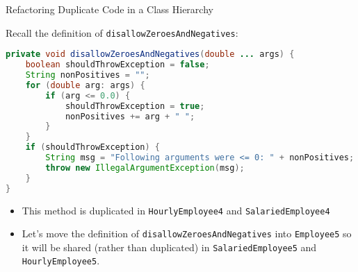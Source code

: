 \documentclass{beamer}
\begin{document}
\begin{frame}[fragile]{Refactoring Duplicate Code in a Class Hierarchy}

\vspace{-.05in}
Recall the definition of {\tt disallowZeroesAndNegatives}:
\vspace{-.05in}
\begin{lstlisting}[language=Java]
private void disallowZeroesAndNegatives(double ... args) {
    boolean shouldThrowException = false;
    String nonPositives = "";
    for (double arg: args) {
        if (arg <= 0.0) {
            shouldThrowException = true;
            nonPositives += arg + " ";
        }
    }
    if (shouldThrowException) {
        String msg = "Following arguments were <= 0: " + nonPositives;
        throw new IllegalArgumentException(msg);
    }
}
\end{lstlisting}
\vspace{-.075in}
\begin{itemize}
\item This method is duplicated in {\tt HourlyEmployee4} and {\tt SalariedEmployee4}
\item Let's move the definition of {\tt disallowZeroesAndNegatives} into {\tt Employee5} so it will be shared (rather than duplicated) in {\tt SalariedEmployee5} and {\tt HourlyEmployee5}.
\end{itemize}


\end{frame}



\end{document}
